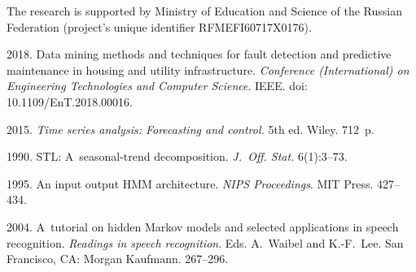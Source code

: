       
      
      
      


\Ack
      \noindent
      The research is supported by Ministry of Education and Science of the 
Russian Federation (project's unique identifier RFMEFI60717X0176).



\vspace*{6pt}

  \begin{multicols}{2}

\renewcommand{\bibname}{\protect\rmfamily References}

{\small\frenchspacing
 {%
 \begin{thebibliography}{99}
 2018. Data mining 
methods and techniques for fault detection and predictive maintenance in housing and utility 
infrastructure. \textit{Conference (International) on Engineering Technologies and Computer 
Science}. IEEE. doi: 10.1109/EnT.2018.00016.
\vspace*{2pt}

 2015. 
\textit{Time 
series analysis: Forecasting and control.} 5th ed. Wiley. 712~p.
\vspace*{2pt}

 1990. STL: 
A~seasonal-trend decomposition. \textit{J.~Off. Stat.} 6(1):3--73.
\vspace*{2pt}

 1995. An input output HMM architecture. 
\textit{NIPS Proceedings}. MIT Press. 427--434.
\vspace*{2pt}

 2004. A~tutorial on hidden Markov models and selected applications in 
speech recognition. \textit{Readings in speech recognition}. 
Eds. A.~Waibel and K.-F.~Lee. San Francisco, CA: Morgan Kaufmann. 267--296.
\vspace*{2pt}


\end{thebibliography}}}
\end{multicols}
